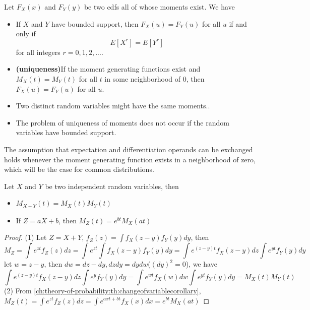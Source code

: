 \begin{refsection}
\begin{theorem}\label{ch:theory-of-probability:th:FundamentalReleationDistributionMomentGeneratingFunction}\cite[65]{casella2002statistical}\label{ch:theory-of-probability:th:mgfimpliespdf}
	Let $F_X(x)$ and $F_Y(y)$ be two cdfs all of whose moments exist. We have
	\begin{itemize}
		\item If $X$ and $Y$ have bounded support, then $F_X(u) = F_Y(u)$ for all $u$ if and only if $$E[X^r] = E[Y^r]$$ for all integers $r = 0,1,2,...$.
		\item \textbf{(uniqueness)}If the moment generating functions exist and $M_X(t) = M_Y(t)$ for all $t$ in some neighborhood of 0, then $F_X(u) = F_Y(u)$ for all $u$.
	\end{itemize}
\end{theorem}


\begin{remark}\hfill
\begin{itemize}
	\item Two distinct random variables might have the same moments.\cite[64]{casella2002statistical}.
	\item The problem of uniqueness of moments does not occur if the random variables have bounded support.
\end{itemize}
\end{remark}


\begin{remark}
The assumption that expectation and differentiation operands can be exchanged holds whenever the moment generating function exists in a neighborhood of zero, which will be the case for common distributions.\cite{mitzenmacher2005probability}
\end{remark}


\begin{lemma}\cite[67]{casella2002statistical}\label{ch:theory-of-probability:th:additionandscalingtheoremformgf}
Let $X$ and $Y$ be two independent random variables, then
\begin{itemize}
	\item $M_{X+Y}(t) = M_X(t)M_Y(t)$
	\item If $Z = aX+b$, then $M_Z(t) = e^{bt}M_X(at)$
\end{itemize}
\end{lemma}
\begin{proof}
(1) Let $Z = X+Y$, $f_Z(z) = \int f_X(z-y)f_Y(y)dy$, then
$$M_Z = \int e^{zt}f_Z(z)dz = \int e^{zt} \int f_X(z-y)f_Y(y)dy = \int e^{(z-y)t}f_X(z-y)dz \int e^{yt} f_Y(y)dy$$
let $w = z-y$, then $dw = dz - dy, dzdy = dydw$($(dy)^2=0$), we have 
$$\int e^{(z-y)t}f_X(z-y)dz \int e^y f_Y(y)dy = \int e^{wt} f_X(w)dw \int e^{yt}f_Y(y)dy = M_X(t)M_Y(t)$$
(2) From \autoref{ch:theory-of-probability:th:changeofvariablecorollary}, $M_Z(t) = \int e^{zt}f_Z(z)dz = \int e^{axt+bt}f_X(x)dx = e^{bt}M_X(at)$
\end{proof}


\end{refsection}
